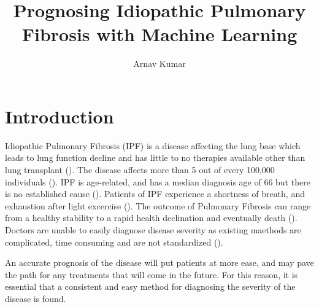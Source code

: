 \documentclass[12pt]{article}
\title{Prognosing Idiopathic Pulmonary Fibrosis with Machine Learning}
\author{Arnav Kumar}
\renewcommand{\maketitle}{
    \begin{center}
        {\large \thetitle}

        \vspace{0.1em}
        {\theauthor}
    \end{center}
}
\begin{document}
\maketitle
\thispagestyle{fancy}

\section{Introduction}


Idiopathic Pulmonary Fibrosis (IPF) is a disease affecting the lung base which leads to lung function decline and has little to no therapies available other than lung transplant (\cite{mason1999pharmacological,gross2001idiopathic}). 
The disease affects more than 5 out of every 100,000 individuals (\cite{coultas1994epidemiology,mason1999pharmacological,raghu2018diagnosis}). 
IPF is age-related, and has a median diagnosis age of 66 but there is no established cause (\cite{king2011idiopathic,raghu2018diagnosis}).
Patients of IPF experience a shortness of breath, and exhaustion after light excercise (\cite{gross2001idiopathic}).
The outcome of Pulmonary Fibrosis can range from a healthy stability to a rapid health declination and eventually death (\cite{robbie2017evaluating}). 
Doctors are unable to easily diagnose disease severity as existing maethods are complicated, time consuming and are not standardized (\cite{robbie2017evaluating}). 

An accurate prognosis of the disease will put patients at more ease, and may pave the path for any treatments that will come in the future. 
For this reason, it is essential that a consistent and easy method for diagnosing the severity of the disease is found.

\end{document}
